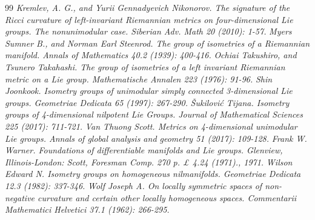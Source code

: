 \documentclass[12pt,a4paper,twoside]{article}
\theoremstyle{definition}
\begin{document}
\begin{thebibliography}{99}
\emph{Kremlev, A. G., and Yurii Gennadyevich Nikonorov. The signature of the Ricci curvature of left-invariant Riemannian metrics on four-dimensional Lie groups. The nonunimodular case. Siberian Adv. Math 20 (2010): 1-57.}
\emph{Myers Sumner B., and Norman Earl Steenrod. The group of isometries of a Riemannian manifold. Annals of Mathematics 40.2 (1939): 400-416.}
\emph{Ochiai Takushiro, and Tsunero Takahashi. The group of isometries of a left invariant Riemannian metric on a Lie group. Mathematische Annalen 223 (1976): 91-96.}
\emph{Shin Joonkook. Isometry groups of unimodular simply connected 3-dimensional Lie groups. Geometriae Dedicata 65 (1997): 267-290.}
\emph{\v{S}ukilovi\'{c} Tijana. Isometry groups of 4-dimensional nilpotent Lie Groups. Journal of Mathematical Sciences 225 (2017): 711-721.}
\emph{Van Thuong Scott. Metrics on 4-dimensional unimodular Lie groups. Annals of global analysis and geometry 51 (2017): 109-128.}
\emph{Frank W. Warner. Foundations of differentiable manifolds and Lie groups. Glenview, Illinois-London: Scott, Foresman Comp. 270 p. £ 4.24 (1971)., 1971.}
\emph{Wilson Edward N. Isometry groups on homogeneous nilmanifolds. Geometriae Dedicata 12.3 (1982): 337-346.}
\emph{Wolf Joseph A. On locally symmetric spaces of non-negative curvature and certain other locally homogeneous spaces. Commentarii Mathematici Helvetici 37.1 (1962): 266-295.}
	
\end{thebibliography}
\end{document}
